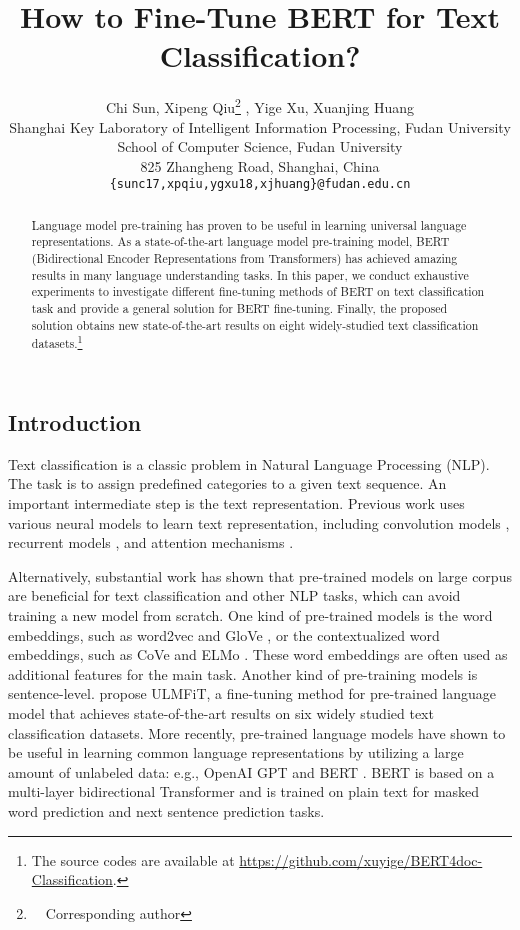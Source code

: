 \documentclass[11pt,a4paper]{article}
\title{How to Fine-Tune BERT for Text Classification?}
\author{Chi Sun, Xipeng Qiu\thanks{\ \  Corresponding author} , Yige Xu, Xuanjing Huang\\
	Shanghai Key Laboratory of Intelligent Information Processing, Fudan University\\
	School of Computer Science, Fudan University\\
	825 Zhangheng Road, Shanghai, China\\
	{\tt \{sunc17,xpqiu,ygxu18,xjhuang\}@fudan.edu.cn} \\}
\date{}
\theoremstyle{definition}
\begin{document}
	\begin{CJK*}{UTF8}{gbsn}
	\maketitle
	\begin{abstract}
		Language model pre-training has proven to be useful in learning universal language representations. As a state-of-the-art language model pre-training model, BERT (Bidirectional Encoder Representations from Transformers) has achieved amazing results in many language understanding tasks. In this paper, we conduct exhaustive experiments to investigate different fine-tuning methods of BERT on text classification task and provide a general solution for BERT fine-tuning. Finally, the proposed solution obtains new state-of-the-art results on eight widely-studied text classification datasets.\footnote{The source codes are available at \url{https://github.com/xuyige/BERT4doc-Classification}.}
	\end{abstract}
	
	\section{Introduction}
    Text classification is a classic problem in Natural Language Processing (NLP). The task is to assign predefined categories to a given text sequence. An important intermediate step is the text representation. Previous work uses various neural models to learn text representation, including convolution models \cite{kalchbrenner2014convolutional,zhang2015character,conneau2016very,johnson2017deep,zhang2017deconvolutional,shen2018deconvolutional}, recurrent models  \cite{liu2016recurrent,yogatama2017generative,seo2017neural}, and attention mechanisms \cite{yang2016hierarchical,lin2017structured}.

	Alternatively, substantial work has shown that pre-trained models on large corpus are beneficial for text classification and other NLP tasks, which can avoid training a new model from scratch.
One kind of pre-trained models is the word embeddings, such as word2vec \cite{mikolov2013distributed} and GloVe \cite{pennington2014glove}, or the contextualized word embeddings, such as CoVe \cite{mccann2017learned} and ELMo \cite{peters2018deep}. These word embeddings are often used as additional features for the main task.
Another kind of pre-training models is sentence-level. \citet{howard2018universal} propose ULMFiT, a fine-tuning method for pre-trained language model that achieves state-of-the-art results on six widely studied text classification datasets. More recently, pre-trained language models have shown to be useful in learning common language representations by utilizing a large amount of unlabeled data: e.g., OpenAI GPT \cite{radford2018improving} and BERT \cite{devlin2018bert}. BERT is based on a multi-layer bidirectional Transformer \cite{vaswani2017attention} and is trained on plain text for masked word prediction and next sentence prediction tasks.



\end{CJK*}
\end{document}
